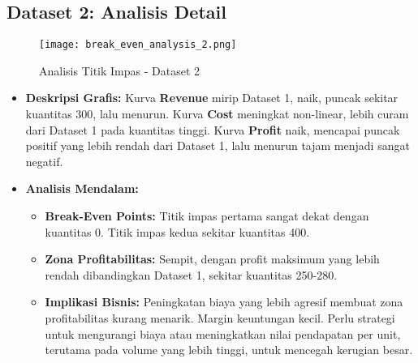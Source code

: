 \documentclass[conference]{IEEEtran}
\begin{document}
\subsection*{Dataset 2: Analisis Detail}
\begin{figure}[H]
    \centering
    \texttt{[image: break\_even\_analysis\_2.png]}
    \caption{Analisis Titik Impas - Dataset 2}
    \label{fig:dataset2_new}
\end{figure}
\begin{itemize}
    \item \textbf{Deskripsi Grafis:} Kurva \textbf{Revenue} mirip Dataset 1, naik, puncak sekitar kuantitas 300, lalu menurun. Kurva \textbf{Cost} meningkat non-linear, lebih curam dari Dataset 1 pada kuantitas tinggi. Kurva \textbf{Profit} naik, mencapai puncak positif yang lebih rendah dari Dataset 1, lalu menurun tajam menjadi sangat negatif.
    \item \textbf{Analisis Mendalam:}
    \begin{itemize}
        \item \textbf{Break-Even Points:} Titik impas pertama sangat dekat dengan kuantitas 0. Titik impas kedua sekitar kuantitas 400.
        \item \textbf{Zona Profitabilitas:} Sempit, dengan profit maksimum yang lebih rendah dibandingkan Dataset 1, sekitar kuantitas 250-280.
        \item \textbf{Implikasi Bisnis:} Peningkatan biaya yang lebih agresif membuat zona profitabilitas kurang menarik. Margin keuntungan kecil. Perlu strategi untuk mengurangi biaya atau meningkatkan nilai pendapatan per unit, terutama pada volume yang lebih tinggi, untuk mencegah kerugian besar.
    \end{itemize}
\end{itemize}
\end{document}
